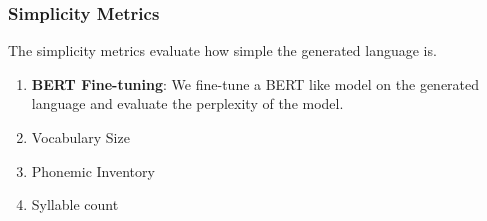 \subsubsection{Simplicity Metrics}
The simplicity metrics evaluate how simple the generated language is.

\begin{enumerate}
	\item \textbf{BERT Fine-tuning}: We fine-tune a BERT like model on the generated language and evaluate the perplexity of the model.
	\item Vocabulary Size
	\item Phonemic Inventory
	\item Syllable count
\end{enumerate}



